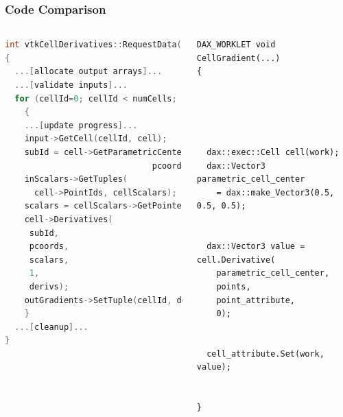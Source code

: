 \documentclass[brown]{beamer}
\begin{document}
\begin{frame}[fragile]
\frametitle{Code Comparison}
\begin{columns}[l]
\begin{lstlisting}[language=C++,basicstyle=\tiny\ttfamily]
int vtkCellDerivatives::RequestData(...)
{
  ...[allocate output arrays]...
  ...[validate inputs]...
  for (cellId=0; cellId < numCells; cellId++)
    {
    ...[update progress]...
    input->GetCell(cellId, cell);
    subId = cell->GetParametricCenter(
                              pcoords);
    inScalars->GetTuples(
      cell->PointIds, cellScalars);
    scalars = cellScalars->GetPointer(0);
    cell->Derivatives(
     subId,
     pcoords,
     scalars,
     1,
     derivs);
    outGradients->SetTuple(cellId, derivs);
    }
  ...[cleanup]...
}
\end{lstlisting}

\begin{lstlisting}[language=Dax, basicstyle=\tiny\ttfamily]
DAX_WORKLET void CellGradient(...)
{





  dax::exec::Cell cell(work);
  dax::Vector3 parametric_cell_center
    = dax::make_Vector3(0.5, 0.5, 0.5);
 

  dax::Vector3 value = cell.Derivative(
    parametric_cell_center,
    points,
    point_attribute,
    0);


  cell_attribute.Set(work, value);


}
\end{lstlisting}
\end{columns}
\end{frame}
\end{document}
